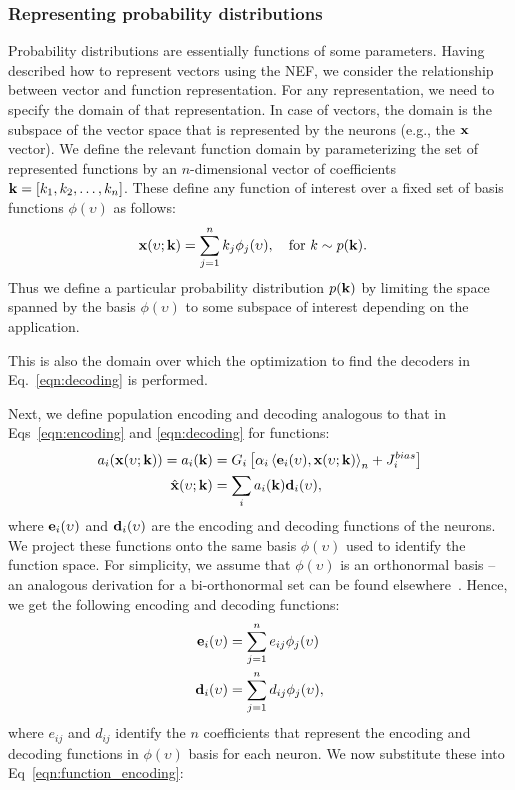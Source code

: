 \documentclass[10pt,letterpaper]{article}
\renewcommand{\vec}[1]{{\bf {#1}}}
\newcommand{\dotp}[3]{\left\langle {#1}, {#2} \right\rangle_{#3}}
\newcommand{\lif}[2]{G_{#1} \left[ {#2} \right]}
\begin{document}
\subsubsection{Representing probability distributions}
Probability distributions are essentially functions of some parameters. Having described how to represent vectors using the NEF, we consider the relationship between vector and function representation. For any representation, we need to specify the domain of that representation. In case of vectors, the domain is the subspace of the vector space that is represented by the neurons (e.g., the $\vec{x}$ vector). We define the relevant function domain by parameterizing the set of represented functions by an $n$-dimensional vector of coefficients $\vec{k} = \left[ k_1, k_2, \ldots, k_n \right]$. These define any function of interest over a fixed set of basis functions $\phi(\upsilon)$ as follows:
\begin{equation}
\label{eqn:function}
\begin{aligned} 
\vec{x}(\upsilon; \vec{k}) = \sum_{j=1}^n k_j \phi_j(\upsilon)  &, \quad \text{for $k \sim p(\vec{k})$} .
\end{aligned}
\end{equation}
Thus we define a particular probability distribution $p(\vec{k})$ by limiting the space spanned by the basis $\phi(\upsilon)$ to some subspace of interest depending on the application.

This is also the domain over which the optimization to find the decoders in Eq.~\ref{eqn:decoding} is performed. 
 
Next, we define population encoding and decoding analogous to that in Eqs~\ref{eqn:encoding} and \ref{eqn:decoding} for functions:
\begin{align} 
a_i(\vec{x}(\upsilon; \vec{k})) = a_i(\vec{k}) &= \lif{i}{\alpha_i \dotp{\vec{e}_i(\upsilon)} {\vec{x}(\upsilon; \vec{k})}{n} + J_i^{bias}} \label{eqn:function_encoding} \\
\hat{\vec{x}}(\upsilon; \vec{k}) &= \sum_i a_i(\vec{k})\vec{d}_i(\upsilon), \label{eqn:function_decoding}
\end{align}
where $\vec{e}_i(\upsilon)$ and $\vec{d}_i(\upsilon)$ are the encoding and decoding functions of the neurons. We project these functions onto the same basis $\phi(\upsilon)$ used to identify the function space. For simplicity, we assume that $\phi(\upsilon)$ is an orthonormal basis -- an analogous derivation for a bi-orthonormal set can be found elsewhere~\cite{eliasmith2011normalization}. Hence, we get the following encoding and decoding functions:
\begin{align}
\vec{e}_i(\upsilon) &= \sum_{j=1}^n e_{ij} \phi_j(\upsilon) \label{eqn:encoding_function} \\
\vec{d}_i(\upsilon) &= \sum_{j=1}^n d_{ij} \phi_j(\upsilon), \label{eqn:decoding_function}
\end{align}
\vspace{-12pt}
where $e_{ij}$ and $d_{ij}$ identify the $n$ coefficients that represent the encoding and decoding functions in $\phi(\upsilon)$ basis for each neuron. We now substitute these into Eq~\ref{eqn:function_encoding}:
\end{document}
